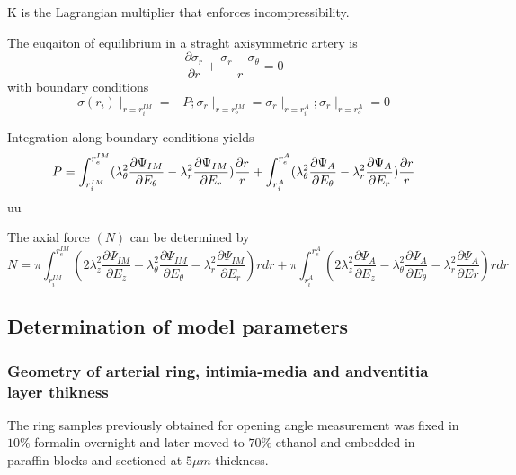 \documentclass[review]{elsarticle}
\begin{document}
K is the Lagrangian multiplier that enforces incompressibility.

The euqaiton of equilibrium in a straght axisymmetric artery is
\begin{equation}
    \frac{\partial \sigma_r}{\partial r}+\frac{\sigma_r-\sigma_\theta}{r}=0
\end{equation}
with boundary conditions
\begin{equation}
    \sigma(r_i)\mid_{r=r_i^{IM}}=-P;\sigma_r\mid_{r=r_o^{IM}}=\sigma_r\mid_{r=r_i^A};\sigma_r\mid_{r=r_o^A}=0
\end{equation}

Integration along boundary conditions yields
\begin{equation}
    P=\int_{r_{i}^{IM}}^{r_{e}^{IM}}(\lambda_\theta^2 \frac{\partial
    \Psi_{IM}}{\partial E_\theta} - \lambda_r^2 \frac{\partial
    \Psi_{IM}}{\partial E_r}) \frac{\partial r}{r}\\
    +\int_{r_{i}^A}^{r_{e}^A}(\lambda_\theta^2 \frac{\partial \Psi_{A}}{\partial E_\theta} - \lambda_r^2 \frac{\partial \Psi_{A}}{\partial E_r}) \frac{\partial r}{r}
\end{equation}uu

The axial force $(N)$ can be determined by
\begin{equation}
    N=\pi \int_{r_{i}^{IM}}^{r_{e}^{IM}}(2\lambda_z^2 \frac{\partial \Psi_{IM}}{\partial E_z}- \lambda_\theta^2 \frac{\partial \Psi_{IM}}{\partial E_\theta}- \lambda_r^2 \frac{\partial \Psi_{IM}}{\partial E_r})rdr 
    +\pi \int_{r_{i}^A}^{r_{e}^A}(2\lambda_z^2 \frac{\partial \Psi_{A}}{\partial E_z}- \lambda_\theta^2 \frac{\partial \Psi_{A}}{\partial E_\theta}- \lambda_r^2 \frac{\partial \Psi_{A}}{\partial Er})rdr                           
\end{equation}

\subsection{Determination of model parameters}
\subsubsection{Geometry of arterial ring, intimia-media and andventitia layer
thikness}

The ring samples previously obtained for opening angle measurement was fixed in
$10\%$ formalin overnight and later moved to $70\%$ ethanol and embedded in
paraffin blocks and sectioned at $5\mu m$ thickness. 
\end{document}

